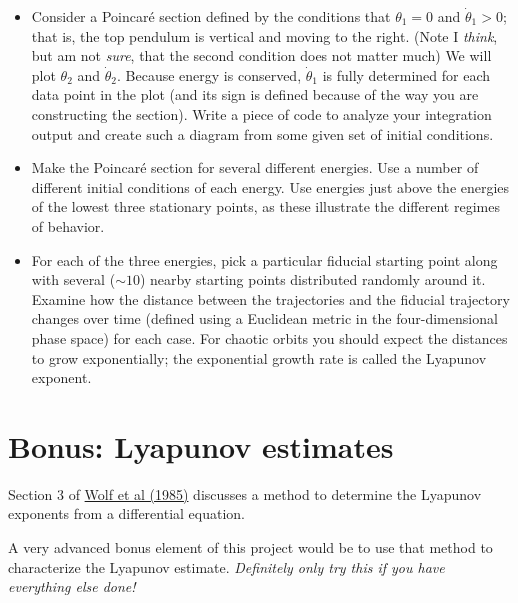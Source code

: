 \documentclass[11pt, preprint]{aastex}
\begin{document}
\begin{itemize}
\item Consider a Poincar{\'e} section defined by the conditions that
  $\theta_1=0$ and $\dot\theta_1>0$; that is, the top pendulum is
  vertical and moving to the right.  (Note I {\it think}, but am not
  {\it sure}, that the second condition does not matter much) We will
  plot $\theta_2$ and $\dot\theta_2$. Because energy is conserved,
  $\dot\theta_1$ is fully determined for each data point in the plot
  (and its sign is defined because of the way you are constructing the
  section). Write a piece of code to analyze your
  integration output and create such a diagram from some given set of
  initial conditions.
 \item Make the Poincar{\'e} section for several different
   energies. Use a number of different initial conditions of each
   energy. Use energies just above the energies of the lowest three
   stationary points, as these illustrate the different regimes of
   behavior.
\item For each of the three energies, pick a particular fiducial
  starting point along with several ($\sim 10$) nearby starting points
  distributed randomly around it. Examine how the distance between the
  trajectories and the fiducial trajectory changes over time (defined
  using a Euclidean metric in the four-dimensional phase space) for
  each case. For chaotic orbits you should expect the distances to
  grow exponentially; the exponential growth rate is called the
  Lyapunov exponent.
\end{itemize}

\section{Bonus: Lyapunov estimates}

Section 3 of
\href{https://www.sciencedirect.com/science/article/pii/0167278985900119}{Wolf
  et al (1985)} discusses a method to determine the Lyapunov exponents
from a differential equation.

A very advanced bonus element of this project would be to use that
method to characterize the Lyapunov estimate. {\it Definitely only try
  this if you have everything else done!}
\end{document}
